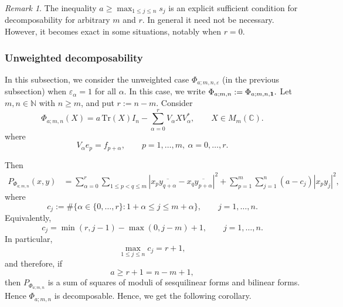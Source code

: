 \documentclass[12pt,a4paper]{amsart}
\theoremstyle{plain}
\newtheorem{corollary}[theorem]{Corollary}
\theoremstyle{remark}
\newtheorem{remark}{Remark}
\theoremstyle{definition}
\newcommand{\Tr}{{\textrm{Tr}}}
\begin{document}
\begin{remark}\rm
	The inequality $ a\ge \max_{1\le j\le n}s_j $
	is an explicit sufficient condition for decomposability for arbitrary $m$ and $r$. In general it need not be necessary. However, it becomes exact in some situations, notably when $r=0$.
\end{remark}
\subsubsection{Unweighted decomposability}
In this subsection, we consider the unweighted case $\Phi_{a;m,n,\varepsilon}$ (in the previous subsection) when $\varepsilon_\alpha=1$ for all $\alpha$. In this case,
we write $\Phi_{a;m,n}:= \Phi_{a;m,n, \bold{1}}.$  
Let $m,n\in\mathbb N$ with $n\ge m$, and put $r:=n-m$. Consider
\[
\Phi_{a;m,n}(X)
=
a\,\Tr(X)I_n-\sum_{\alpha=0}^{r}V_\alpha X V_\alpha^*,
\qquad X\in M_m(\mathbb C).
\]
where
\[
V_\alpha e_p=f_{p+\alpha},\qquad p=1,\dots,m,\ \alpha=0,\dots,r.
\]

Then
	\[
	\begin{aligned}
		P_{\Phi_{a;m,n}}(x,y)
		&=
		\sum_{\alpha=0}^{r}\sum_{1\le p<q\le m}
		\left|x_p\overline{y_{q+\alpha}}-x_q\overline{y_{p+\alpha}}\right|^2
		+
		\sum_{p=1}^m\sum_{j=1}^n (a-c_j)|x_p y_j|^2,
	\end{aligned}
	\]
	where
	\[
	c_j:=\#\{\alpha\in\{0,\dots,r\}:1+\alpha\le j\le m+\alpha\},
	\qquad j=1,\dots,n.
	\]
	Equivalently,
	\[
	c_j=
	\min(r,j-1)-\max(0,j-m)+1,
	\qquad j=1,\dots,n.
	\]
	In particular,
	\[
	\max_{1\le j\le n} c_j=r+1,
	\]
	and therefore, if
	\[
	a\ge r+1=n-m+1,
	\]
	then $P_{\Phi_{a;m,n}}$ is a sum of squares of moduli of sesquilinear forms and bilinear forms. Hence $\Phi_{a;m,n}$ is decomposable.
Hence, we get the following corollary.
\end{document}
